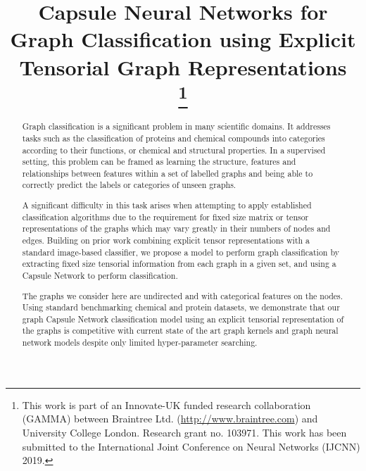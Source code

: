 \documentclass[conference]{IEEEtran}
\begin{document}
\title{Capsule Neural Networks for Graph Classification using Explicit Tensorial Graph Representations\\
{\footnotesize }
\thanks{This work is part of an Innovate-UK funded research collaboration (GAMMA) between Braintree Ltd. (\url{http://www.braintree.com}) and University College London. Research grant no. 103971. This work has been submitted to the International Joint Conference on Neural Networks (IJCNN) 2019.}
}

\author{
\and
{}
\and
{}
}

\maketitle

\begin{abstract}
Graph classification is a significant problem in many scientific domains. It addresses tasks such as the classification of proteins and chemical compounds into categories according to their functions, or chemical and structural properties. In a supervised setting, this problem can be framed as learning the structure, features and relationships between features within a set of labelled graphs and being able to correctly predict the labels or categories of unseen graphs.

A significant difficulty in this task arises when attempting to apply established classification algorithms due to the requirement for fixed size matrix or tensor representations of the graphs which may vary greatly in their numbers of nodes and edges. Building on prior work combining explicit tensor representations with a standard image-based classifier, we propose a model to perform graph classification by extracting fixed size tensorial information from each graph in a given set, and using a Capsule Network to perform classification.

The graphs we consider here are undirected and with categorical features on the nodes. Using standard benchmarking chemical and protein datasets, we demonstrate that our graph Capsule Network classification model using an explicit tensorial representation of the graphs is competitive with current state of the art graph kernels and graph neural network models despite only limited hyper-parameter searching.
\end{abstract}
\end{document}
